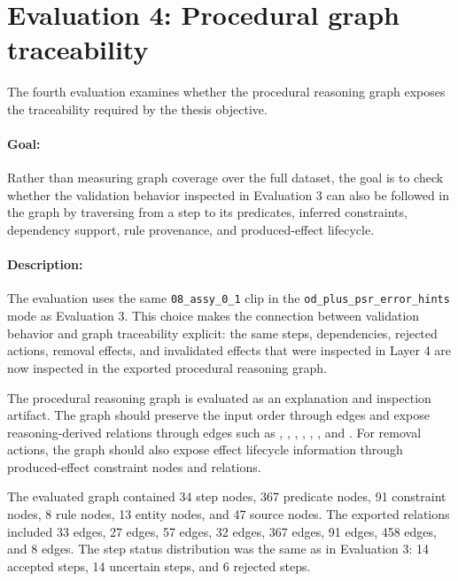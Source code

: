 \section{Evaluation 4: Procedural graph traceability}
\label{sec:evaluation-graph-traceability}

The fourth evaluation examines whether the procedural reasoning graph exposes the
traceability required by the thesis objective.

\paragraph{Goal:}
Rather than measuring graph coverage over the full dataset, the goal is to check
whether the validation behavior inspected in Evaluation 3 can also be followed in
the graph by traversing from a step to its predicates, inferred constraints,
dependency support, rule provenance, and produced-effect lifecycle.

\paragraph{Description:}
The evaluation uses the same \texttt{08\_assy\_0\_1} clip in the
\texttt{od\_plus\_psr\_error\_hints} mode as Evaluation 3. This choice makes the
connection between validation behavior and graph traceability explicit: the same
steps, dependencies, rejected actions, removal effects, and invalidated effects
that were inspected in Layer 4 are now inspected in the exported procedural
reasoning graph.

The procedural reasoning graph is evaluated as an explanation and inspection
artifact. The graph should preserve the input order through  edges
and expose reasoning-derived relations through edges such as ,
, , ,
, , and .
For removal actions, the graph should also expose effect lifecycle information
through produced-effect constraint nodes and  relations.

The evaluated graph contained 34 step nodes, 367 predicate nodes, 91 constraint
nodes, 8 rule nodes, 13 entity nodes, and 47 source nodes. The exported relations
included 33  edges, 27  edges, 57
 edges, 32  edges, 367 
edges, 91  edges, 458  edges, and
8  edges. The step status distribution was the
same as in Evaluation 3: 14 accepted steps, 14 uncertain steps, and 6 rejected
steps.

